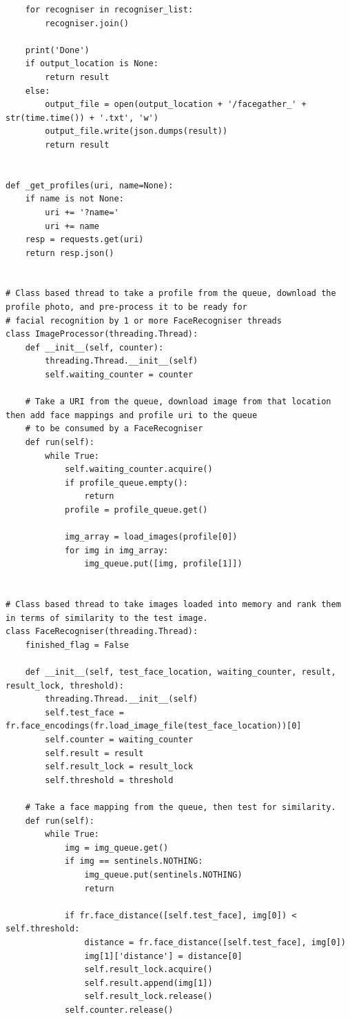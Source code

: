 \documentclass[12pt]{article}
\begin{document}
\begin{appendices}
\begin{lstlisting}
    for recogniser in recogniser_list:
        recogniser.join()

    print('Done')
    if output_location is None:
        return result
    else:
        output_file = open(output_location + '/facegather_' + str(time.time()) + '.txt', 'w')
        output_file.write(json.dumps(result))
        return result


def _get_profiles(uri, name=None):
    if name is not None:
        uri += '?name='
        uri += name
    resp = requests.get(uri)
    return resp.json()


# Class based thread to take a profile from the queue, download the profile photo, and pre-process it to be ready for
# facial recognition by 1 or more FaceRecogniser threads
class ImageProcessor(threading.Thread):
    def __init__(self, counter):
        threading.Thread.__init__(self)
        self.waiting_counter = counter

    # Take a URI from the queue, download image from that location then add face mappings and profile uri to the queue
    # to be consumed by a FaceRecogniser
    def run(self):
        while True:
            self.waiting_counter.acquire()
            if profile_queue.empty():
                return
            profile = profile_queue.get()

            img_array = load_images(profile[0])
            for img in img_array:
                img_queue.put([img, profile[1]])


# Class based thread to take images loaded into memory and rank them in terms of similarity to the test image.
class FaceRecogniser(threading.Thread):
    finished_flag = False

    def __init__(self, test_face_location, waiting_counter, result, result_lock, threshold):
        threading.Thread.__init__(self)
        self.test_face = fr.face_encodings(fr.load_image_file(test_face_location))[0]
        self.counter = waiting_counter
        self.result = result
        self.result_lock = result_lock
        self.threshold = threshold

    # Take a face mapping from the queue, then test for similarity.
    def run(self):
        while True:
            img = img_queue.get()
            if img == sentinels.NOTHING:
                img_queue.put(sentinels.NOTHING)
                return

            if fr.face_distance([self.test_face], img[0]) < self.threshold:
                distance = fr.face_distance([self.test_face], img[0])
                img[1]['distance'] = distance[0]
                self.result_lock.acquire()
                self.result.append(img[1])
                self.result_lock.release()
            self.counter.release()


\end{lstlisting}
\end{appendices}
\end{document}

